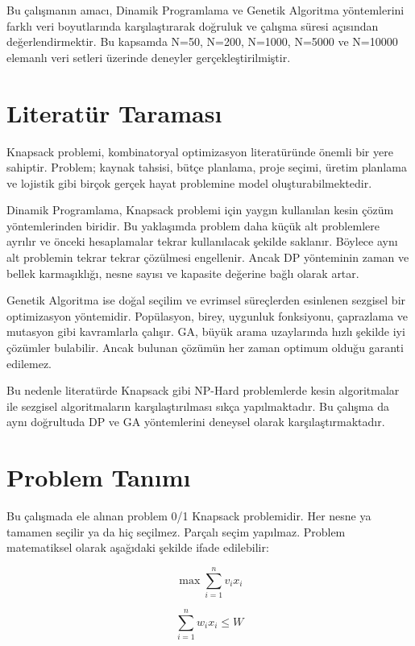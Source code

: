 \documentclass[conference]{IEEEtran}
\begin{document}
Bu çalışmanın amacı, Dinamik Programlama ve Genetik Algoritma yöntemlerini farklı veri boyutlarında karşılaştırarak doğruluk ve çalışma süresi açısından değerlendirmektir. Bu kapsamda N=50, N=200, N=1000, N=5000 ve N=10000 elemanlı veri setleri üzerinde deneyler gerçekleştirilmiştir.

\section{Literatür Taraması}
Knapsack problemi, kombinatoryal optimizasyon literatüründe önemli bir yere sahiptir. Problem; kaynak tahsisi, bütçe planlama, proje seçimi, üretim planlama ve lojistik gibi birçok gerçek hayat problemine model oluşturabilmektedir.

Dinamik Programlama, Knapsack problemi için yaygın kullanılan kesin çözüm yöntemlerinden biridir. Bu yaklaşımda problem daha küçük alt problemlere ayrılır ve önceki hesaplamalar tekrar kullanılacak şekilde saklanır. Böylece aynı alt problemin tekrar tekrar çözülmesi engellenir. Ancak DP yönteminin zaman ve bellek karmaşıklığı, nesne sayısı ve kapasite değerine bağlı olarak artar.

Genetik Algoritma ise doğal seçilim ve evrimsel süreçlerden esinlenen sezgisel bir optimizasyon yöntemidir. Popülasyon, birey, uygunluk fonksiyonu, çaprazlama ve mutasyon gibi kavramlarla çalışır. GA, büyük arama uzaylarında hızlı şekilde iyi çözümler bulabilir. Ancak bulunan çözümün her zaman optimum olduğu garanti edilemez.

Bu nedenle literatürde Knapsack gibi NP-Hard problemlerde kesin algoritmalar ile sezgisel algoritmaların karşılaştırılması sıkça yapılmaktadır. Bu çalışma da aynı doğrultuda DP ve GA yöntemlerini deneysel olarak karşılaştırmaktadır.

\section{Problem Tanımı}
Bu çalışmada ele alınan problem 0/1 Knapsack problemidir. Her nesne ya tamamen seçilir ya da hiç seçilmez. Parçalı seçim yapılmaz. Problem matematiksel olarak aşağıdaki şekilde ifade edilebilir:

\begin{equation}
\max \sum_{i=1}^{n} v_i x_i
\end{equation}

\begin{equation}
\sum_{i=1}^{n} w_i x_i \leq W
\end{equation}
\end{document}
